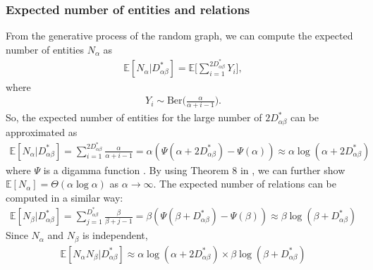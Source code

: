 \documentclass{article}
\begin{document}
\subsubsection{Expected number of entities and relations}
From the generative process of the random graph, we can compute the expected number of entities $N_\alpha$ as
\begin{align}
\mathbb{E}[N_\alpha|D^*_{\alpha\beta}] = \mathbb{E}\bigg[\sum_{i=1}^{2D^*_{\alpha\beta}} Y_i\bigg],
\end{align}
where
\begin{align}
Y_i \sim \text{Ber}\bigg(\frac{\alpha}{\alpha+i-1}\bigg).
\end{align}
So, the expected number of entities for the large number of $2D^*_{\alpha\beta}$ can be approximated as
\begin{align}
\mathbb{E}[N_\alpha|D^*_{\alpha\beta}] = \sum_{i=1}^{2D^*_{\alpha\beta}}\frac{\alpha}{\alpha+i-1} = \alpha(\Psi(\alpha + 2D^*_{\alpha\beta}) - \Psi(\alpha)) \approx \alpha \log (\alpha + 2D^*_{\alpha\beta})
\end{align}
where $\Psi$ is a digamma function \citep{arratia2003logarithmic}. By using Theorem 8 in \citep{Caron2015}, we can further show $\mathbb{E}[N_\alpha] = \Theta(\alpha \log\alpha)$ as $\alpha \rightarrow \infty$.
The expected number of relations can be computed in a similar way:
\begin{align}
\mathbb{E}[N_\beta|D^*_{\alpha\beta}] = \sum_{j=1}^{D^*_{\alpha\beta}}\frac{\beta}{\beta+j-1} = \beta(\Psi(\beta + D^*_{\alpha\beta}) - \Psi(\beta)) \approx \beta \log (\beta + D^*_{\alpha\beta})
\end{align}
Since $N_\alpha$ and $N_\beta$ is independent,
\begin{align}
\mathbb{E}[N_\alpha N_\beta|D^*_{\alpha\beta}] \approx \alpha \log (\alpha + 2D^*_{\alpha\beta}) \times \beta \log (\beta + D^*_{\alpha\beta})
\end{align}
\end{document}
